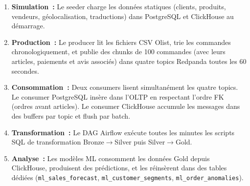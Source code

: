 \begin{enumerate}
  \setlength{\itemsep}{0.4em}
  \item \textbf{Simulation~:} Le seeder charge les données statiques (clients, produits, vendeurs, géolocalisation, traductions) dans PostgreSQL et ClickHouse au démarrage.
  \item \textbf{Production~:} Le producer lit les fichiers CSV Olist, trie les commandes chronologiquement, et publie des chunks de 100 commandes (avec leurs articles, paiements et avis associés) dans quatre topics Redpanda toutes les 60 secondes.
  \item \textbf{Consommation~:} Deux consumers lisent simultanément les quatre topics. Le consumer PostgreSQL insère dans l'OLTP en respectant l'ordre FK (ordres avant articles). Le consumer ClickHouse accumule les messages dans des buffers par topic et flush par batch.
  \item \textbf{Transformation~:} Le DAG Airflow exécute toutes les minutes les scripts SQL de transformation Bronze$\rightarrow$Silver puis Silver$\rightarrow$Gold.
  \item \textbf{Analyse~:} Les modèles ML consomment les données Gold depuis ClickHouse, produisent des prédictions, et les réinsèrent dans des tables dédiées (\texttt{ml\_sales\_forecast}, \texttt{ml\_customer\_segments}, \texttt{ml\_order\_anomalies}).
\end{enumerate}
